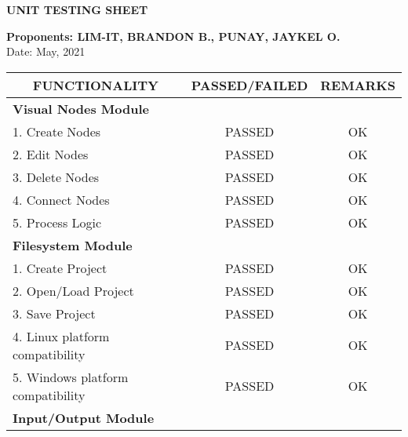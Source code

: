 \clearpage
{}
\textbf{UNIT TESTING SHEET}
\leavevmode\\
\begin{flushleft}
	\textbf{Proponents: LIM-IT, BRANDON B., PUNAY, JAYKEL O.}
	\leavevmode\\
	Date: May, 2021
\end{flushleft}

\begin{longtable}[c]{|l|c|c|}
\hline
\multicolumn{1}{|c|}{\textbf{FUNCTIONALITY}} & \textbf{PASSED/FAILED} & \textbf{REMARKS} \\ \hline
\endfirsthead
%
\endhead
%
\multicolumn{3}{|l|}{\textbf{Visual Nodes Module}}                                       \\ \hline
1. Create Nodes                              & PASSED                 & OK               \\ \hline
2. Edit Nodes                                & PASSED                 & OK               \\ \hline
3. Delete Nodes                              & PASSED                 & OK               \\ \hline
4. Connect Nodes                             & PASSED                 & OK               \\ \hline
5. Process Logic                             & PASSED                 & OK               \\ \hline
\multicolumn{3}{|l|}{\textbf{Filesystem Module}}                                         \\ \hline
1. Create Project                            & PASSED                 & OK               \\ \hline
2. Open/Load Project                         & PASSED                 & OK               \\ \hline
3. Save Project                              & PASSED                 & OK               \\ \hline
4. Linux platform compatibility              & PASSED                 & OK               \\ \hline
5. Windows platform compatibility            & PASSED                 & OK               \\ \hline
\multicolumn{3}{|l|}{\textbf{Input/Output Module}}                                       \\ \hline

\end{longtable}
